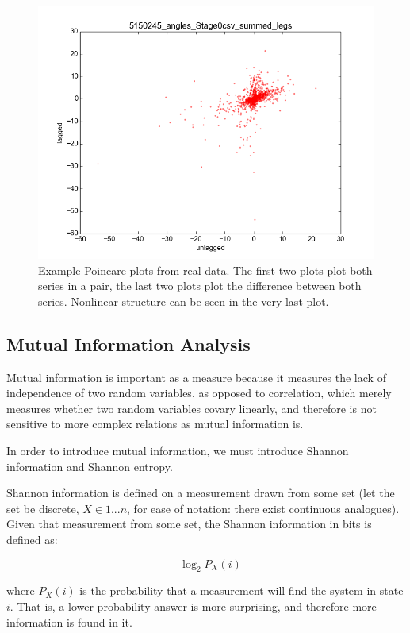 \documentclass[12pt]{article}
\begin{document}
\begin{figure}
\begin{center}
    \includegraphics[scale=0.4]{poincare_4}
  \end{center}
  \caption{Example Poincare plots from real data. The first two plots plot both series in a pair, the last two plots plot the difference between both series. Nonlinear structure can be seen in the very last plot.}
\end{figure}

\subsection{Mutual Information Analysis}

Mutual information is important as a measure because it measures the lack of independence of two random variables, as opposed to correlation, which merely measures whether two random variables covary linearly, and therefore is not sensitive to more complex relations as mutual information is.

In order to introduce mutual information, we must introduce Shannon information and Shannon entropy\cite{nnmi}.

Shannon information is defined on a measurement drawn from some set (let the set be discrete, $X \in {1 ... n}$, for ease of notation: there exist continuous analogues). Given that measurement from some set, the Shannon information in bits is defined as:

$$ -\log_2 P_X(i) $$

where $P_X(i)$ is the probability that a measurement will find the system in state $i$. That is, a lower probability answer is more surprising, and therefore more information is found in it.
\end{document}
